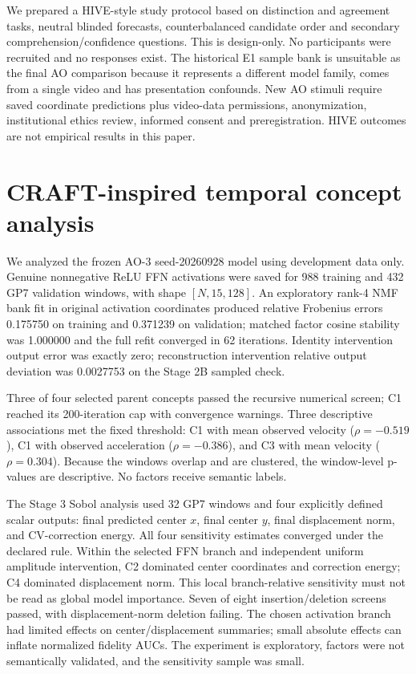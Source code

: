 \documentclass[11pt]{article}
\begin{document}
We prepared a HIVE-style study protocol based on distinction and agreement tasks, neutral blinded forecasts, counterbalanced candidate order and secondary comprehension/confidence questions. This is design-only. No participants were recruited and no responses exist. The historical E1 sample bank is unsuitable as the final AO comparison because it represents a different model family, comes from a single video and has presentation confounds. New AO stimuli require saved coordinate predictions plus video-data permissions, anonymization, institutional ethics review, informed consent and preregistration. HIVE outcomes are not empirical results in this paper.

\section{CRAFT-inspired temporal concept analysis}
We analyzed the frozen AO-3 seed-20260928 model using development data only. Genuine nonnegative ReLU FFN activations were saved for 988 training and 432 GP7 validation windows, with shape $[N,15,128]$. An exploratory rank-4 NMF bank fit in original activation coordinates produced relative Frobenius errors 0.175750 on training and 0.371239 on validation; matched factor cosine stability was 1.000000 and the full refit converged in 62 iterations. Identity intervention output error was exactly zero; reconstruction intervention relative output deviation was 0.0027753 on the Stage 2B sampled check.

Three of four selected parent concepts passed the recursive numerical screen; C1 reached its 200-iteration cap with convergence warnings. Three descriptive associations met the fixed threshold: C1 with mean observed velocity ($\rho=-0.519$), C1 with observed acceleration ($\rho=-0.386$), and C3 with mean velocity ($\rho=0.304$). Because the windows overlap and are clustered, the window-level p-values are descriptive. No factors receive semantic labels.

The Stage 3 Sobol analysis used 32 GP7 windows and four explicitly defined scalar outputs: final predicted center $x$, final center $y$, final displacement norm, and CV-correction energy. All four sensitivity estimates converged under the declared rule. Within the selected FFN branch and independent uniform amplitude intervention, C2 dominated center coordinates and correction energy; C4 dominated displacement norm. This local branch-relative sensitivity must not be read as global model importance. Seven of eight insertion/deletion screens passed, with displacement-norm deletion failing. The chosen activation branch had limited effects on center/displacement summaries; small absolute effects can inflate normalized fidelity AUCs. The experiment is exploratory, factors were not semantically validated, and the sensitivity sample was small.
\end{document}
